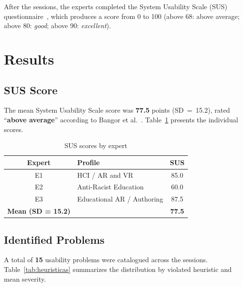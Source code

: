 \documentclass[conference]{IEEEtran}
\begin{document}
After the sessions, the experts completed the System Usability Scale (SUS)
questionnaire~\cite{brooke1996}, which produces a score from 0 to 100 (above
68: above average; above 80: \textit{good}; above 90: \textit{excellent}).

\section{Results}

\subsection{SUS Score}

The mean System Usability Scale score was \textbf{77.5} points (SD~=~15.2),
rated ``\textbf{above average}'' according to Bangor et
al.~\cite{bangor2009}. Table~\ref{tab:sus} presents the individual scores.

\begin{table}[htbp]
\caption{SUS scores by expert}
\label{tab:sus}
\begin{center}
\renewcommand{\arraystretch}{1.2}
\begin{tabular}{|c|l|c|}
\hline
\textbf{Expert} & \textbf{Profile} & \textbf{SUS} \\
\hline
E1 & HCI / AR and VR  & 85.0 \\
E2 & Anti-Racist Education & 60.0 \\
E3 & Educational AR / Authoring & 87.5 \\
\hline
\textbf{Mean (SD = 15.2)} & & \textbf{77.5} \\
\hline
\end{tabular}
\end{center}
\end{table}

\subsection{Identified Problems}

A total of \textbf{15} usability problems were catalogued across the
sessions. Table~\ref{tab:heuristicas} summarizes the distribution by
violated heuristic and mean severity.
\end{document}
